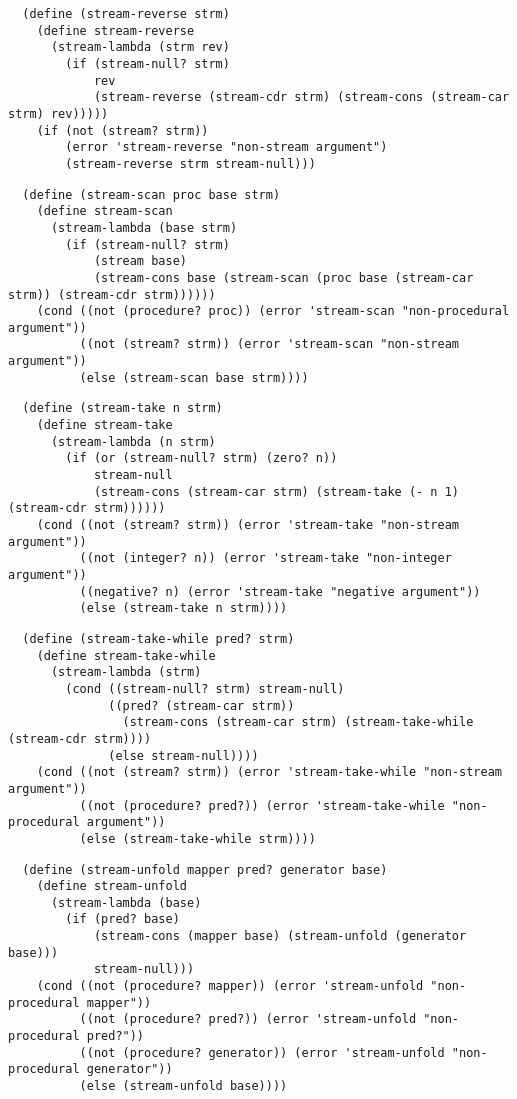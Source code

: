 \begin{verbatim}
  (define (stream-reverse strm)
    (define stream-reverse
      (stream-lambda (strm rev)
        (if (stream-null? strm)
            rev
            (stream-reverse (stream-cdr strm) (stream-cons (stream-car strm) rev)))))
    (if (not (stream? strm))
        (error 'stream-reverse "non-stream argument")
        (stream-reverse strm stream-null)))
\end{verbatim}

\begin{verbatim}
  (define (stream-scan proc base strm)
    (define stream-scan
      (stream-lambda (base strm)
        (if (stream-null? strm)
            (stream base)
            (stream-cons base (stream-scan (proc base (stream-car strm)) (stream-cdr strm))))))
    (cond ((not (procedure? proc)) (error 'stream-scan "non-procedural argument"))
          ((not (stream? strm)) (error 'stream-scan "non-stream argument"))
          (else (stream-scan base strm))))
\end{verbatim}

\begin{verbatim}
  (define (stream-take n strm)
    (define stream-take
      (stream-lambda (n strm)
        (if (or (stream-null? strm) (zero? n))
            stream-null
            (stream-cons (stream-car strm) (stream-take (- n 1) (stream-cdr strm))))))
    (cond ((not (stream? strm)) (error 'stream-take "non-stream argument"))
          ((not (integer? n)) (error 'stream-take "non-integer argument"))
          ((negative? n) (error 'stream-take "negative argument"))
          (else (stream-take n strm))))
\end{verbatim}

\begin{verbatim}
  (define (stream-take-while pred? strm)
    (define stream-take-while
      (stream-lambda (strm)
        (cond ((stream-null? strm) stream-null)
              ((pred? (stream-car strm))
                (stream-cons (stream-car strm) (stream-take-while (stream-cdr strm))))
              (else stream-null))))
    (cond ((not (stream? strm)) (error 'stream-take-while "non-stream argument"))
          ((not (procedure? pred?)) (error 'stream-take-while "non-procedural argument"))
          (else (stream-take-while strm))))
\end{verbatim}

\begin{verbatim}
  (define (stream-unfold mapper pred? generator base)
    (define stream-unfold
      (stream-lambda (base)
        (if (pred? base)
            (stream-cons (mapper base) (stream-unfold (generator base)))
            stream-null)))
    (cond ((not (procedure? mapper)) (error 'stream-unfold "non-procedural mapper"))
          ((not (procedure? pred?)) (error 'stream-unfold "non-procedural pred?"))
          ((not (procedure? generator)) (error 'stream-unfold "non-procedural generator"))
          (else (stream-unfold base))))
\end{verbatim}

